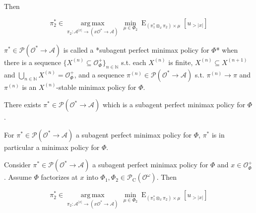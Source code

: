 \documentclass[a4paper]{article}
\DeclareMathOperator{\E}{E}
\newcommand{\Argmax}[1]{\underset{#1}{\operatorname{arg\,max}}\,}
\newcommand{\Nats}{\mathbb{N}}
\newcommand{\Abs}[1]{\lvert #1 \rvert}
\newcommand{\Prob}{\mathcal{P}}
\newcommand{\Act}{\mathcal{A}}
\newcommand{\Obs}{\mathcal{O}}
\newcommand{\Pol}{\Obs^* \rightarrow \Act}
\newcommand{\Env}{\Obs^\omega}
\newcommand{\MixPol}{\Prob(\Pol)}
\newcommand{\PC}{\Prob_{\operatorname{C}}}
\newcommand{\Mod}{\PC(\Env)}
\newcommand{\Adm}{\Obs_\Phi^+}
\begin{document}
Then

$$\pi^*_2 \in \Argmax{\pi_2: \Act^{\Abs{x}} \rightarrow (x\Obs^* \rightarrow \Act)} \min_{\mu \in \Phi_2} \E_{(\pi_1^* \otimes_x \pi_2) \times \mu}[u_{>\Abs{x}}]$$


${\pi^* \in \MixPol}$ is called a *subagent perfect minimax policy for ${\Phi}$* when there is a sequence ${\{X^{(n)} \subseteq \Adm\}_{n \in \Nats}}$ s.t. each ${X^{(n)}}$ is finite, ${X^{(n)} \subseteq X^{(n+1)}}$ and ${\bigcup_{n \in \Nats} X^{(n)} = \Adm}$, and a sequence ${\pi^{(n)} \in \MixPol}$ s.t. ${\pi^{(n)} \rightarrow \pi}$ and ${\pi^{(n)}}$ is an ${X^{(n)}}$-stable minimax policy for ${\Phi}$.


There exists $\pi^* \in \MixPol$ which is a subagent perfect minimax policy for $\Phi$.


For $\pi^* \in \MixPol$ a subagent perfect minimax policy for $\Phi$, ${\pi^*}$ is in particular a minimax policy for $\Phi$.


Consider $\pi^* \in \MixPol$ a subagent perfect minimax policy for $\Phi$ and ${x \in \Adm}$. Assume ${\Phi}$ factorizes at ${x}$ into ${\Phi_1,\Phi_2 \in \Mod}$.
Then

$$\pi^*_2 \in \Argmax{\pi_2: \Act^{\Abs{x}} \rightarrow (x\Obs^* \rightarrow \Act)} \min_{\mu \in \Phi_2} \E_{(\pi_1^* \otimes_x \pi_2) \times \mu}[u_{>\Abs{x}}]$$


\end{document}
